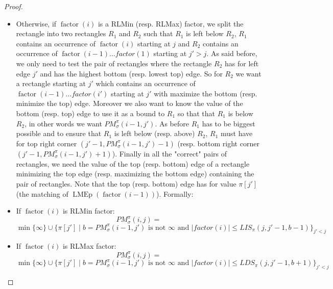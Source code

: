 \documentclass[a4paper]{llncs}
\newcommand{\ptext}{\pi}
\newcommand{\PM}{PM}
\DeclareMathOperator{\LMEi}{LMEp}
\DeclareMathOperator{\factor}{factor}
\begin{document}
\begin{proof}
\begin{itemize}
\item Otherwise, if $\factor(i)$ is a RLMin (resp. RLMax) factor,
 we split the rectangle into two rectangles $R_1$ and
$R_2$ such that $R_1$ is left below $R_2$,
$R_1$ contains an occurrence of $\factor(i)$ starting at
$j$
and $R_2$ contains an occurrence of $\factor(i-1) \ldots factor(1)$
starting at $j'>j$.
As said before, we only need to test the pair of rectangles
where the rectangle $R_2$ has for left edge $j'$
and has the highest bottom (resp. lowest top) edge.
So for $R_2$ we want
a rectangle starting at $j'$
which contains an occurrence of $\factor(i-1) \ldots factor(i')$
starting at $j'$
with maximize the bottom (resp. minimize the top) edge.
Moreover we also want to know the value of the bottom (resp. top) edge to use it as a bound to $R_1$ so that
that $R_1$ is below $R_2$,
in other words we want $\PM^\pi_\sigma(i-1,j')$.
As before $R_1$ has to be biggest possible and
to ensure that $R_1$ is left below (resp. above) $R_2$,
$R_1$ must have for top right corner $(j'-1, \PM^\pi_\sigma(i-1,j')-1 )$
(resp. bottom right corner $(j'-1, \PM^\pi_\sigma(i-1,j')+1 )$).
Finally in all the "correct" pairs of rectangles,
we need the value of the top (resp. bottom) edge of a rectangle minimizing the top edge (resp. maximizing the bottom edge)
containing the pair of rectangles. Note that the top (resp. bottom) edge has for value $\pi[j']$
(the matching of  $\LMEi(\factor(i-1))$). Formally:

\item If $\factor(i)$ is RLMin factor:\\
$$
\PM^\pi_\sigma(i,j) =
$$
$
\min \{\infty\} \cup \{ \pi[j'] \mid b=\PM^\pi_\sigma(i-1,j') \text{ is not $\infty$ and }
 |factor(i)| \leq LIS_{\ptext}(j,j'-1,b-1) \}_{j' < j}
$

\item If $\factor(i)$ is RLMax factor:\\
$$
\PM^\pi_\sigma(i,j) =
$$
$
\min \{\infty\} \cup \{ \pi[j'] \mid b=\PM^\pi_\sigma(i-1,j') \text{ is not $\infty$ and }
|factor(i)| \leq LDS_{\ptext}(j,j'-1,b+1) \}_{j' < j}
$




\end{itemize}


\end{proof}
\end{document}
